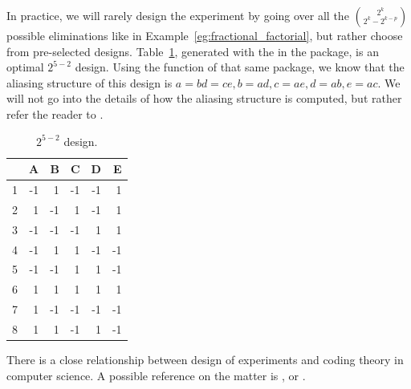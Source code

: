 In practice, we will rarely design the experiment by going over all the $\binom{2^k}{2^k-2^{k-p}}$ possible eliminations like in Example~\ref{eg:fractional_factorial}, but rather choose from pre-selected designs. 
Table~\ref{tab:partial_factorial_ii}, generated with the  in the  \R package, is an optimal $2^{5-2}$ design.
Using the  function of that same package, we know that the aliasing structure of this design is
$a=bd=ce, b=ad, c=ae, d=ab, e=ac$.
We will not go into the details of how the aliasing structure is computed, but rather refer the reader to \cite{cox_theory_2000}.
\begin{table}[ht]
\centering
\begin{tabular}{rrrrrr}
  \hline
 & A & B & C & D & E \\ 
  \hline
1 & -1 & 1 & -1 & -1 & 1 \\ 
  2 & 1 & -1 & 1 & -1 & 1 \\ 
  3 & -1 & -1 & -1 & 1 & 1 \\ 
  4 & -1 & 1 & 1 & -1 & -1 \\ 
  5 & -1 & -1 & 1 & 1 & -1 \\ 
  6 & 1 & 1 & 1 & 1 & 1 \\ 
  7 & 1 & -1 & -1 & -1 & -1 \\ 
  8 & 1 & 1 & -1 & 1 & -1 \\ 
   \hline
\end{tabular}
\caption[Fractional Factorial Design]{$2^{5-2}$ design.}
\label{tab:partial_factorial_ii}
\end{table}





\begin{extra}
There is a close relationship between design of experiments and coding theory in computer science. 
A possible reference on the matter is \cite{hill_first_1986}, or \cite{hedayat_orthogonal_1999}.
\end{extra}


%
%






